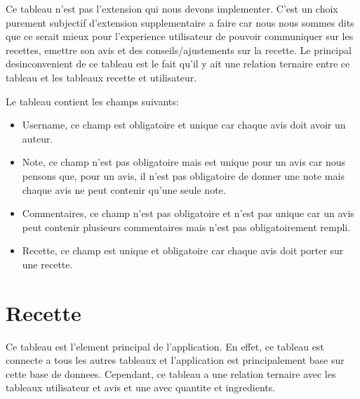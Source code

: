 \documentclass[a4paper,10pt]{report}
\begin{document}
Ce tableau n'est pas l'extension qui nous devons implementer. C'est un choix purement subjectif d'extension supplementaire a faire car nous nous sommes dits que ce serait mieux pour l'experience utilisateur de pouvoir communiquer sur les recettes, emettre son avis et des conseils/ajustements sur la recette. Le principal desinconvenient de ce tableau est le fait qu'il y ait une relation ternaire entre ce tableau et les tableaux recette et utilisateur.

Le tableau contient les champs suivants:
\begin{itemize}
	\item Username, ce champ est obligatoire et unique car chaque avis doit avoir un auteur.
	\item Note, ce champ n'est pas obligatoire mais est unique pour un avis car nous pensons que, pour un avis, il n'est pas obligatoire de donner une note mais chaque avis ne peut contenir qu'une seule note.
	\item Commentaires, ce champ n'est pas obligatoire et n'est pas unique car un avis peut contenir plusieurs commentaires mais n'est pas obligatoirement rempli.
	\item Recette, ce champ est unique et obligatoire car chaque avis doit porter sur une recette.
\end{itemize}

\section{Recette}

Ce tableau est l'element principal de l'application. En effet, ce tableau est connecte a tous les autres tableaux et l'application est principalement base sur cette base de donnees. Cependant, ce tableau a une relation ternaire avec les tableaux utilisateur et avis et une avec quantite et ingredients.
\end{document}
